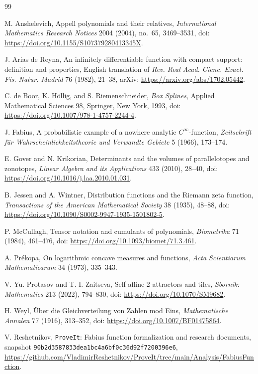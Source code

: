 \documentclass[11pt,oneside]{article}
\theoremstyle{definition}
\theoremstyle{remark}
\begin{document}
\begin{thebibliography}{99}

M. Anshelevich,
\newblock Appell polynomials and their relatives,
\newblock \emph{International Mathematics Research Notices} 2004 (2004), no.~65,
3469--3531,
\newblock doi: \url{https://doi.org/10.1155/S107379280413345X}.

J. Arias de Reyna,
\newblock An infinitely differentiable function with compact support: definition
and properties,
\newblock English translation of \emph{Rev. Real Acad. Cienc. Exact. Fis. Natur.
Madrid} 76 (1982), 21--38,
\newblock arXiv: \url{https://arxiv.org/abs/1702.05442}.

C. de Boor, K. H\"ollig, and S. Riemenschneider,
\newblock \emph{Box Splines},
\newblock Applied Mathematical Sciences 98, Springer, New York, 1993,
\newblock doi: \url{https://doi.org/10.1007/978-1-4757-2244-4}.

J. Fabius,
\newblock A probabilistic example of a nowhere analytic $C^\infty$-function,
\newblock \emph{Zeitschrift f\"ur Wahrscheinlichkeitstheorie und Verwandte
Gebiete} 5 (1966), 173--174.

E. Gover and N. Krikorian,
\newblock Determinants and the volumes of parallelotopes and zonotopes,
\newblock \emph{Linear Algebra and its Applications} 433 (2010), 28--40,
\newblock doi: \url{https://doi.org/10.1016/j.laa.2010.01.031}.

B. Jessen and A. Wintner,
\newblock Distribution functions and the Riemann zeta function,
\newblock \emph{Transactions of the American Mathematical Society} 38 (1935),
48--88,
\newblock doi: \url{https://doi.org/10.1090/S0002-9947-1935-1501802-5}.

P. McCullagh,
\newblock Tensor notation and cumulants of polynomials,
\newblock \emph{Biometrika} 71 (1984), 461--476,
\newblock doi: \url{https://doi.org/10.1093/biomet/71.3.461}.

A. Pr\'ekopa,
\newblock On logarithmic concave measures and functions,
\newblock \emph{Acta Scientiarum Mathematicarum} 34 (1973), 335--343.

V. Yu. Protasov and T. I. Zaitseva,
\newblock Self-affine 2-attractors and tiles,
\newblock \emph{Sbornik: Mathematics} 213 (2022), 794--830,
\newblock doi: \url{https://doi.org/10.1070/SM9682}.

H. Weyl,
\newblock \"Uber die Gleichverteilung von Zahlen mod Eins,
\newblock \emph{Mathematische Annalen} 77 (1916), 313--352,
\newblock doi: \url{https://doi.org/10.1007/BF01475864}.

V. Reshetnikov,
\newblock \texttt{ProveIt}: Fabius function formalization and research documents,
\newblock snapshot \texttt{90b2d3587833dea1bc4a6bf0c36d92f7200396e6},
\newblock \url{https://github.com/VladimirReshetnikov/ProveIt/tree/main/Analysis/FabiusFunction}.

\end{thebibliography}
\end{document}
